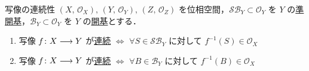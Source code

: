 \documentclass[geometry_main]{subfiles}
\begin{document}
\begin{mylem}[label=lem:continuous, breakable]{写像の連続性}
    $(X,\, \mathscr{O}_X),\, (Y,\, \mathscr{O}_Y),\, (Z,\, \mathscr{O}_Z)$ を位相空間，$\mathcal{SB}_Y \subset \mathscr{O}_Y$ を $Y$ の\hyperref[def:subbase]{準開基}，$\mathcal{B}_Y \subset \mathscr{O}_Y$ を $Y$ の\hyperref[def.opbase]{開基}とする．
    \begin{enumerate}
        \item 写像 $f \colon X \longrightarrow Y$ が\hyperref[def.continuous]{連続} $\iff$ $\forall S \in \mathcal{SB}_Y$ に対して $f^{-1}(S) \in \mathscr{O}_X$
        \item 写像 $f \colon X \longrightarrow Y$ が\hyperref[def.continuous]{連続} $\iff$ $\forall B \in \mathcal{B}_Y$ に対して $f^{-1}(B) \in \mathscr{O}_X$
    \end{enumerate}
\end{mylem}
\end{document}
